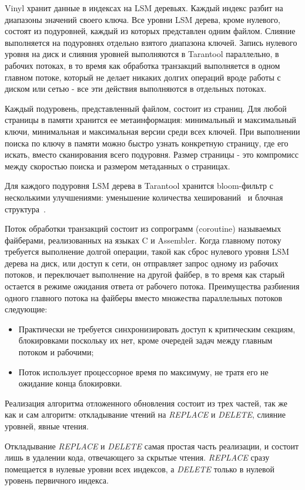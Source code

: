 \documentclass[a4paper,hidelinks,12pt]{article}
\begin{document}
Vinyl хранит данные в индексах на LSM деревьях. Каждый индекс разбит на
диапазоны значений своего ключа. Все уровни LSM дерева, кроме нулевого, состоят
из подуровней, каждый из которых представлен одним файлом. Слияние выполняется
на подуровнях отдельно взятого диапазона ключей. Запись нулевого уровня на диск
и слияния уровней выполняются в Tarantool параллельно, в рабочих потоках, в то
время как обработка транзакций выполняется в одном главном потоке, который не
делает никаких долгих операций вроде работы с диском или сетью - все эти
действия выполняются в отдельных потоках.

Каждый подуровень, представленный файлом, состоит из страниц. Для любой страницы
в памяти хранится ее метаинформация: минимальный и максимальный ключи,
минимальная и максимальная версии среди всех ключей. При выполнении поиска по
ключу в памяти можно быстро узнать конкретную страницу, где его искать, вместо
сканирования всего подуровня. Размер страницы - это компромисс между скоростью
поиска и размером метаданных о страницах.

Для каждого подуровня LSM дерева в Tarantool хранится bloom-фильтр с несколькими
улучшениями: уменьшение количества хеширований~\cite{bloom_less_hashing} и
блочная структура~\cite{bloom_blocked}.

Поток обработки транзакций состоит из сопрограмм (coroutine) называемых
файберами, реализованных на языках C и Assembler. Когда главному потоку
требуется выполнение долгой операции, такой как сброс нулевого уровня LSM дерева
на диск, или доступ к сети, он отправляет запрос одному из рабочих потоков, и
переключает выполнение на другой файбер, в то время как старый остается в режиме
ожидания ответа от рабочего потока. Преимущества разбиения одного главного
потока на файберы вместо множества параллельных потоков следующие:
\begin{itemize}
\item Практически не требуется синхронизировать доступ к критическим секциям,
блокировками поскольку их нет, кроме очередей задач между главным потоком и
рабочими;
\item Поток использует процессорное время по максимуму, не тратя его не ожидание
конца блокировки.
\end{itemize}

Реализация алгоритма отложенного обновления состоит из трех частей, так же как и
сам алгоритм: откладывание чтений на \textit{REPLACE} и \textit{DELETE},
слияние уровней, явные чтения.

Откладывание \textit{REPLACE} и \textit{DELETE} самая простая часть реализации,
и состоит лишь в удалении кода, отвечающего за скрытые чтения. \textit{REPLACE}
сразу помещается в нулевые уровни всех индексов, а \textit{DELETE} только в
нулевой уровень первичного индекса.
\end{document}
